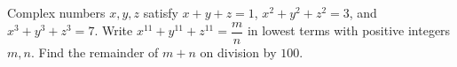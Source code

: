 Complex numbers $x,y,z$ satisfy $x+y+z=1$, $x^2+y^2+z^2=3$, and $x^3+y^3+z^3=7$. Write $x^{11}+y^{11}+z^{11}=\dfrac{m}{n}$ in lowest terms with positive integers $m,n$. Find the remainder of $m+n$ on division by $100$.

